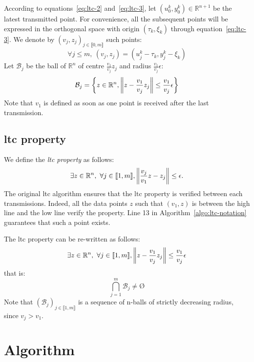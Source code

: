 According to equations~\eqref{eq:ltc-2} and~\eqref{eq:ltc-3}, let $(u_0^k,
y_0^k) \in \mathbb{R}^{n+1}$ be the latest transmitted point. For convenience,
all the subsequent points will be expressed in the orthogonal space with origin
$(\tau_k, \xi_k)$ through equation~\eqref{eq:ltc-3}. We denote by $(v_j, z_j)_{j
\in \llbracket 0, m \rrbracket}$ such points:
\begin{equation}
\forall j \leq m,\  (v_j, z_j) = (u_j^k - \tau_k, y_j^k - \xi_k)
\end{equation}
Let $\mathcal{B}_j$ be the ball of $\mathbb{R}^n$ of centre $\frac{v_1}{v_j}z_j$
and radius $\frac{v_1}{v_j}\epsilon$:
\begin{equation}
\mathcal{B}_j = \left\{ z \in \mathbb{R}^n,\left\lVert z-\frac{v_1}{v_j}z_j\right\rVert \leq\frac{v_1}{v_j}\epsilon \right\}
\end{equation}
Note that $v_1$ is defined as soon as one point is received after the last
transmission.

\subsection{\acrshort{ltc} property}
\label{sec:ltc-property}

We define the \emph{\acrshort{ltc} property} as follows:
\begin{equation}
\exists z \in \mathbb{R}^n, \ \forall j \in \llbracket 1, m \rrbracket, \left\lVert\frac{v_j}{v_1}z-z_j\right\rVert \leq
\epsilon.
\end{equation}
The original \acrshort{ltc} algorithm ensures that the \acrshort{ltc} property
is verified between each transmissions. Indeed, all the data points $z$ such
that $(v_1, z)$ is between the high line and the low line verify the property.
Line 13 in Algorithm~\ref{algo:ltc-notation} guarantees that such a point
exists.

The \acrshort{ltc} property can be re-written as follows:
\begin{equation}
\exists z \in \mathbb{R}^n, \ \forall j \in \llbracket 1, m \rrbracket, \norm{z-\frac{v_1}{v_j}z_j} \leq
\frac{v_1}{v_j}\epsilon
\end{equation}
that is:
\begin{equation}
\bigcap_{j=1}^m \mathcal{B}_j \neq \text{\O}
\label{eq:ltc-property}
\end{equation}
Note that $(\mathcal{B}_j)_{j \in \llbracket 1, m \rrbracket}$ is a sequence
of n-balls of strictly decreasing radius, since $v_j > v_1$.

\section{Algorithm}

